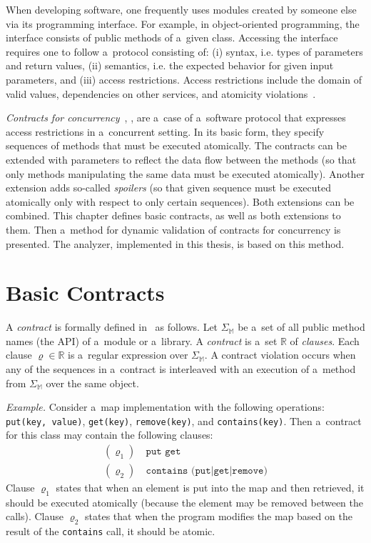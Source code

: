 When developing software, one frequently uses modules created by someone else
via its programming interface. For example, in object-oriented programming, the
interface consists of public methods of a~given class. Accessing the interface
requires one to follow a~protocol consisting of: (i) syntax, i.e. types of
parameters and return values, (ii) semantics, i.e. the expected behavior for
given input parameters, and (iii) access restrictions. Access restrictions
include the domain of valid values, dependencies on other services, and
atomicity violations~\cite{contracts}.

\emph{Contracts for concurrency}~\cite{FITPUB10817},
\cite{DBLP:journals/corr/SousaDFL15}, are a~case of a~software protocol that
expresses access restrictions in a~concurrent setting. In its basic form, they
specify sequences of methods that must be executed atomically. The contracts can
be extended with parameters to reflect the data flow between the methods (so
that only methods manipulating the same data must be executed atomically).
Another extension adds so-called \emph{spoilers} (so that given sequence must be
executed atomically only with respect to only certain sequences). Both
extensions can be combined. This chapter defines basic contracts, as well as
both extensions to them. Then a~method for dynamic validation of contracts for
concurrency is presented. The analyzer, implemented in this thesis, is based on
this method.

\section{Basic Contracts}
\label{basicContracts}

A \emph{contract} is formally defined in~\cite{FITPUB10817} as follows. Let
$\Sigma_\mathbb{M}$ be a~set of all public method names (the API) of a~module or
a~library. A \emph{contract} is a~set $\mathbb{R}$ of \emph{clauses}. Each
clause $\varrho \in \mathbb{R}$ is a~regular expression over
$\Sigma_\mathbb{M}$. A contract violation occurs when any of the sequences in
a~contract is interleaved with an execution of a~method from $\Sigma_\mathbb{M}$
over the same object.

\emph{Example.} Consider a~map implementation with the following operations:
\texttt{put(key, value)}, \texttt{get(key)}, \texttt{remove(key)}, and
\texttt{contains(key)}. Then a~contract for this class may contain the following
clauses:
\begin{align*}
    (\varrho_1) &\ \texttt{put get}\\
    (\varrho_2) &\ \texttt{contains (put|get|remove)}
\end{align*}
Clause $\varrho_1$ states that when an element is put into the map and then
retrieved, it should be executed atomically (because the element may be removed
between the calls). Clause $\varrho_2$ states that when the program modifies the
map based on the result of the \texttt{contains} call, it should be atomic.


